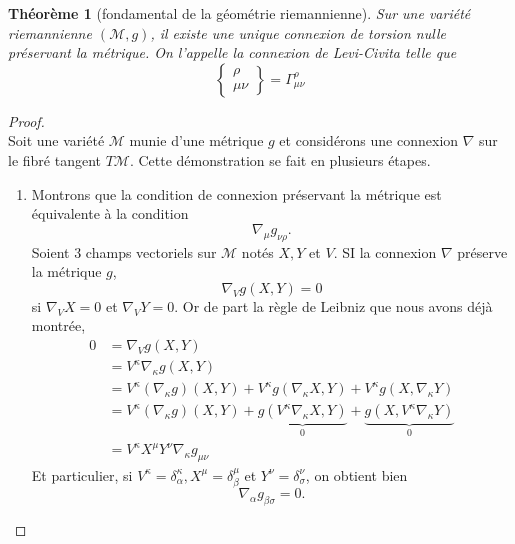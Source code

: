 \documentclass[a4paper,11pt]{report}
\theoremstyle{definition}
\theoremstyle{plain}
\newtheorem{thm}{Théorème}[chapter]
\theoremstyle{definition}
\theoremstyle{remark}
\newcommand{\M}{\mathscr{M}}
\newcommand{\chris}[3]{\begin{Bmatrix}#1\\#2#3\end{Bmatrix}}
\begin{document}
                \begin{thm}[fondamental de la géométrie riemannienne]
                    Sur une variété riemannienne $(\M,g)$, il existe une unique connexion de torsion nulle préservant la métrique. On l'appelle la \textit{connexion de Levi-Civita} telle que
                    \begin{equation}
                        \chris{\rho}{\mu}{\nu}=\Gamma^\rho_{\mu\nu}
                    \end{equation}
                \end{thm}
                
                \begin{proof}${}$\\
                    Soit une variété $\M$ munie d'une métrique $g$ et considérons une connexion $\nabla$ sur le fibré tangent $T\M$.
                    Cette démonstration se fait en plusieurs étapes.
                    \begin{enumerate}[label = \textit{\roman*)}]
                            \item Montrons que la condition de connexion préservant la            métrique est équivalente à la condition
                                \begin{equation}
                                    \nabla_\mu g_{\nu\rho}.
                                \end{equation}
                                Soient $3$ champs vectoriels sur $\M$ notés $X,Y$ et $V$. SI la connexion $\nabla$ préserve la métrique $g$, 
                                \begin{equation}
                                    \nabla_Vg(X,Y) = 0
                                \end{equation}
                                si $\nabla_V X = 0$ et $\nabla_V Y = 0$. Or de part la règle de Leibniz que nous avons déjà montrée,
                                \begin{align}
                                    0 &= \nabla_Vg(X,Y) \\
                                    &= V^\kappa \nabla_\kappa g(X,Y)\\
                                    &= V^\kappa(\nabla_\kappa g)(X,Y) + V^\kappa g( \nabla_\kappa X,Y) + V^\kappa g(X, \nabla_\kappa Y)\\
                                    &= V^\kappa(\nabla_\kappa g)(X,Y) + \underbrace{g(V^\kappa \nabla_\kappa X,Y)}_{0} +  \underbrace{g(X, V^\kappa\nabla_\kappa Y)}_{0}\\
                                    &= V^\kappa X^\mu Y^\nu \nabla_\kappa g_{\mu\nu}
                                \end{align}
                                Et particulier, si $V^\kappa = \delta^\kappa_\alpha,X^\mu = \delta^\mu_\beta$ et $Y^\nu = \delta^\nu_\sigma$, on obtient bien
                                \begin{equation}
                                    \nabla_\alpha g_{\beta\sigma} = 0.
                                \end{equation}
                                

\end{enumerate}
\end{proof}
\end{document}
